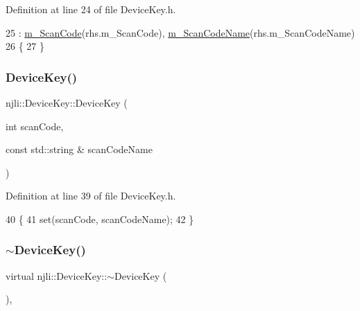 Definition at line 24 of file Device\+Key.\+h.


\begin{DoxyCode}
25         : \mbox{\hyperlink{classnjli_1_1_device_key_a326eb4f8f1b7abc2b916c8ed11d8dca6}{m\_ScanCode}}(rhs.m\_ScanCode), \mbox{\hyperlink{classnjli_1_1_device_key_ac619bfe3e166c9f9ddda4e308f4315d9}{m\_ScanCodeName}}(rhs.m\_ScanCodeName)
26     \{
27     \}
\end{DoxyCode}
\mbox{\label{classnjli_1_1_device_key_ab7f6d643ded11dc722c507ce6171c58a}} 
\subsubsection{\texorpdfstring{Device\+Key()}{DeviceKey()}\hspace{0.1cm}{\footnotesize\ttfamily [3/3]}}
{\footnotesize\ttfamily njli\+::\+Device\+Key\+::\+Device\+Key (\begin{DoxyParamCaption}\item[{int}]{scan\+Code,  }\item[{const std\+::string \&}]{scan\+Code\+Name }\end{DoxyParamCaption})\hspace{0.3cm}{\ttfamily [inline]}}



Definition at line 39 of file Device\+Key.\+h.


\begin{DoxyCode}
40     \{
41       \textcolor{keyword}{set}(scanCode, scanCodeName);
42     \}
\end{DoxyCode}
\mbox{\label{classnjli_1_1_device_key_a06bc979d7804180fd4e383798ee308ab}} 
\subsubsection{\texorpdfstring{$\sim$\+Device\+Key()}{~DeviceKey()}}
{\footnotesize\ttfamily virtual njli\+::\+Device\+Key\+::$\sim$\+Device\+Key (\begin{DoxyParamCaption}{ }\end{DoxyParamCaption})\hspace{0.3cm}{\ttfamily [inline]}, {\ttfamily [virtual]}}



